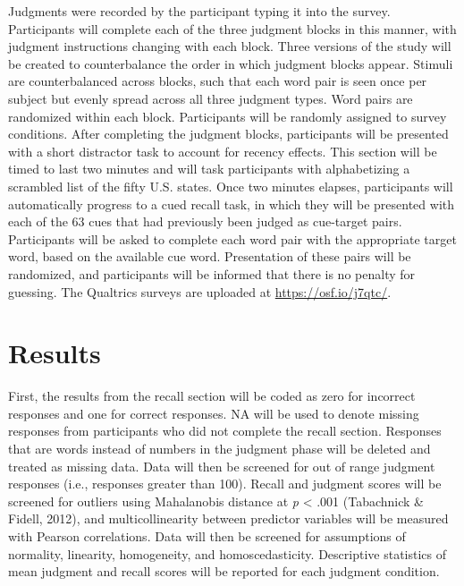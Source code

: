 \documentclass[english,man]{apa6}
\theoremstyle{definition}
\theoremstyle{definition}
\theoremstyle{definition}
\theoremstyle{remark}
\begin{document}
Judgments were recorded by the participant typing it into the survey.
Participants will complete each of the three judgment blocks in this
manner, with judgment instructions changing with each block. Three
versions of the study will be created to counterbalance the order in
which judgment blocks appear. Stimuli are counterbalanced across blocks,
such that each word pair is seen once per subject but evenly spread
across all three judgment types. Word pairs are randomized within each
block. Participants will be randomly assigned to survey conditions.
After completing the judgment blocks, participants will be presented
with a short distractor task to account for recency effects. This
section will be timed to last two minutes and will task participants
with alphabetizing a scrambled list of the fifty U.S. states. Once two
minutes elapses, participants will automatically progress to a cued
recall task, in which they will be presented with each of the 63 cues
that had previously been judged as cue-target pairs. Participants will
be asked to complete each word pair with the appropriate target word,
based on the available cue word. Presentation of these pairs will be
randomized, and participants will be informed that there is no penalty
for guessing. The Qualtrics surveys are uploaded at
\url{https://osf.io/j7qtc/}.

\section{Results}\label{results}

First, the results from the recall section will be coded as zero for
incorrect responses and one for correct responses. NA will be used to
denote missing responses from participants who did not complete the
recall section. Responses that are words instead of numbers in the
judgment phase will be deleted and treated as missing data. Data will
then be screened for out of range judgment responses (i.e., responses
greater than 100). Recall and judgment scores will be screened for
outliers using Mahalanobis distance at \emph{p} \textless{} .001
(Tabachnick \& Fidell, 2012), and multicollinearity between predictor
variables will be measured with Pearson correlations. Data will then be
screened for assumptions of normality, linearity, homogeneity, and
homoscedasticity. Descriptive statistics of mean judgment and recall
scores will be reported for each judgment condition.
\end{document}
